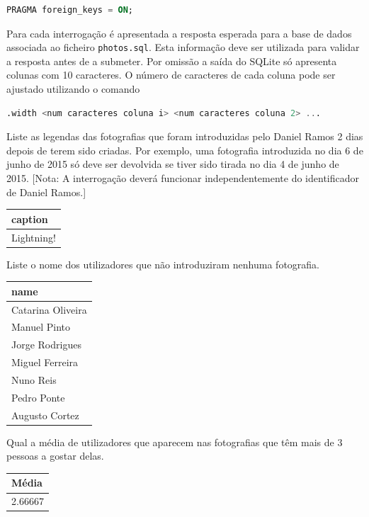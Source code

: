 \documentclass[type=normal, year=2014/15]{bdad_exam}
\begin{document}
{\begin{lstlisting}[language=SQL,numbers=none]
PRAGMA foreign_keys = ON;
\end{lstlisting}

Para cada interrogação é apresentada a resposta esperada para a base de dados associada ao ficheiro \texttt{photos.sql}. Esta informação deve ser utilizada para validar a resposta antes de a submeter. Por omissão a saída do SQLite só apresenta colunas com 10 caracteres. O número de caracteres de cada coluna pode ser ajustado utilizando o comando

\begin{lstlisting}[language=SQL,numbers=none]
.width <num caracteres coluna i> <num caracteres coluna 2> ...
\end{lstlisting}

Liste as legendas das fotografias que foram introduzidas pelo Daniel Ramos 2 dias depois de terem sido criadas. Por exemplo, uma fotografia introduzida no dia 6 de junho de 2015 só deve ser devolvida se tiver sido tirada no dia 4 de junho de 2015. [Nota: A interrogação deverá funcionar independentemente do identificador de Daniel Ramos.]
\begin{center} \begin{tabular}{l}
    \textbf{caption} \\ \hline
    Lightning!
\end{tabular} \end{center}


Liste o nome dos utilizadores que não introduziram nenhuma fotografia.
\begin{center} \begin{tabular}{l}
    \textbf{name}     \\ \hline
    Catarina Oliveira \\
    Manuel Pinto      \\
    Jorge Rodrigues   \\
    Miguel Ferreira   \\
    Nuno Reis         \\
    Pedro Ponte       \\
    Augusto Cortez
\end{tabular} \end{center}


Qual a média de utilizadores que aparecem nas fotografias que têm mais de 3 pessoas a gostar delas.
\begin{center} \begin{tabular}{l}
    \textbf{Média}     \\ \hline
    2.66667
\end{tabular} \end{center}


}
\end{document}
